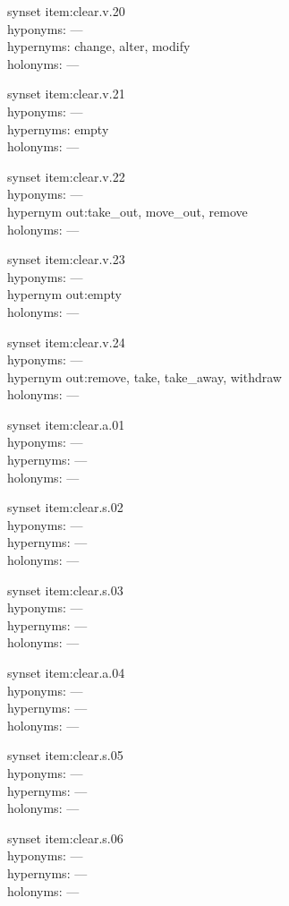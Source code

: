 \begin{multicols}{2}
synset item:clear.v.20\\
hyponyms: ---\\
hypernyms: change, alter, modify\\
holonyms: ---

synset item:clear.v.21\\
hyponyms: ---\\
hypernyms: empty\\
holonyms: ---

synset item:clear.v.22\\
hyponyms: ---\\
hypernym out:take\_out, move\_out, remove\\
holonyms: ---

synset item:clear.v.23\\
hyponyms: ---\\
hypernym out:empty\\
holonyms: ---

synset item:clear.v.24\\
hyponyms: ---\\
hypernym out:remove, take, take\_away, withdraw\\
holonyms: ---

synset item:clear.a.01\\
hyponyms: ---\\
hypernyms: ---\\
holonyms: ---

synset item:clear.s.02\\
hyponyms: ---\\
hypernyms: ---\\
holonyms: ---

synset item:clear.s.03\\
hyponyms: ---\\
hypernyms: ---\\
holonyms: ---

synset item:clear.a.04\\
hyponyms: ---\\
hypernyms: ---\\
holonyms: ---

synset item:clear.s.05\\
hyponyms: ---\\
hypernyms: ---\\
holonyms: ---

synset item:clear.s.06\\
hyponyms: ---\\
hypernyms: ---\\
holonyms: ---


\end{multicols}
